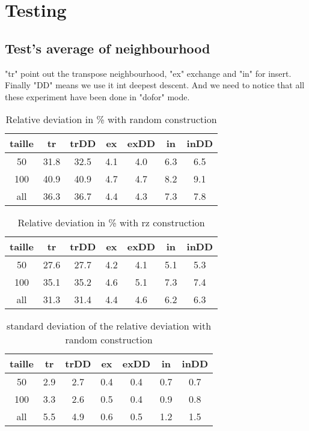 \documentclass[12pt,a4paper]{article}
\begin{document}
\section{Testing}

\subsection{Test's average of neighbourhood}

"tr" point out the transpose neighbourhood, "ex" exchange and "in" for insert. Finally "DD" means we use it int deepest descent. And we need to notice that all these experiment have been done in "dofor" mode.

\begin{table}[!h]
\centering
\begin{tabular}{|*{7}{c|}}
  \hline
  taille & tr & trDD & ex & exDD & in & inDD \\
  \hline
  50 & 31.8 & 32.5 & 4.1 & 4.0 & 6.3 & 6.5 \\ 
  100 & 40.9 & 40.9 & 4.7 & 4.7 & 8.2 & 9.1 \\
  all & 36.3 & 36.7 & 4.4 & 4.3 & 7.3 & 7.8 \\
  \hline
\end{tabular}
\caption{Relative deviation in \% with random construction}
\end{table}

\begin{table}[!h]
\centering
\begin{tabular}{|*{7}{c|}}
  \hline
  taille & tr & trDD & ex & exDD & in & inDD \\
  \hline
  50 & 27.6 & 27.7 & 4.2 & 4.1 & 5.1 & 5.3 \\ 
  100 & 35.1 & 35.2 & 4.6 & 5.1 & 7.3 & 7.4 \\
  all & 31.3 & 31.4 & 4.4 & 4.6 & 6.2 & 6.3 \\
  \hline
\end{tabular}
\caption{Relative deviation in \% with rz construction}
\end{table}

\begin{table}[!h]
\centering
\begin{tabular}{|*{7}{c|}}
  \hline
  taille & tr & trDD & ex & exDD & in & inDD \\
  \hline
  50 & 2.9 & 2.7 & 0.4 & 0.4 & 0.7 & 0.7 \\ 
  100 & 3.3 & 2.6 & 0.5 & 0.4 & 0.9 & 0.8 \\
  all & 5.5 & 4.9 & 0.6 & 0.5 & 1.2 & 1.5 \\
  \hline
\end{tabular}
\caption{standard deviation of the relative deviation with random construction}
\end{table}
\end{document}
